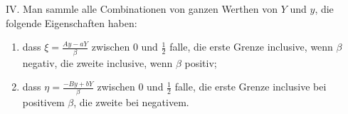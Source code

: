 IV. Man sammle alle Combinationen von ganzen Werthen von $Y$ und $y$, die folgende Eigenschaften haben:
\begin{enumerate}
\item dass $\xi=\frac{Ay-aY}{\beta}$ zwischen $0$ und $\frac12$ falle, die erste Grenze inclusive, wenn $\beta$ negativ, die zweite inclusive, wenn $\beta$ positiv;
\item dass $\eta=\frac{-By+bY}{\beta}$ zwischen $0$ und $\frac12$ falle, die erste Grenze inclusive bei positivem $\beta$, die zweite bei negativem.
\end{enumerate}

